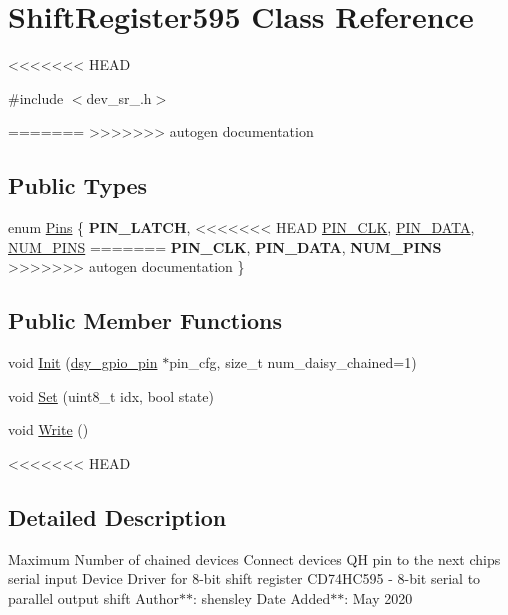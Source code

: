 \hypertarget{class_shift_register595}{}\section{Shift\+Register595 Class Reference}
\label{class_shift_register595}
<<<<<<< HEAD


{\ttfamily \#include $<$dev\+\_\+sr\+\_.\+h$>$}

=======
>>>>>>> autogen documentation
\subsection*{Public Types}
\begin{DoxyCompactItemize}
\item 
enum \hyperlink{class_shift_register595_a2e0140c5d6cac8821d558b2683f7a134}{Pins} \{ {\bfseries P\+I\+N\+\_\+\+L\+A\+T\+CH}, 
<<<<<<< HEAD
\hyperlink{class_shift_register595_a2e0140c5d6cac8821d558b2683f7a134a4e50d83a47cc620a8427d2879aca30ec}{P\+I\+N\+\_\+\+C\+LK}, 
\hyperlink{class_shift_register595_a2e0140c5d6cac8821d558b2683f7a134ae9ea4e9926a41b050735081ea122036b}{P\+I\+N\+\_\+\+D\+A\+TA}, 
\hyperlink{class_shift_register595_a2e0140c5d6cac8821d558b2683f7a134a831131c4aff6b1c4ab21fa12d9c47a38}{N\+U\+M\+\_\+\+P\+I\+NS}
=======
{\bfseries P\+I\+N\+\_\+\+C\+LK}, 
{\bfseries P\+I\+N\+\_\+\+D\+A\+TA}, 
{\bfseries N\+U\+M\+\_\+\+P\+I\+NS}
>>>>>>> autogen documentation
 \}
\end{DoxyCompactItemize}
\subsection*{Public Member Functions}
\begin{DoxyCompactItemize}
\item 
void \hyperlink{class_shift_register595_acc9e7d74069edd4b2711a9de01e9617c}{Init} (\hyperlink{structdsy__gpio__pin}{dsy\+\_\+gpio\+\_\+pin} $\ast$pin\+\_\+cfg, size\+\_\+t num\+\_\+daisy\+\_\+chained=1)
\item 
void \hyperlink{class_shift_register595_a01d31561cd07890ea52d1f39e55a8385}{Set} (uint8\+\_\+t idx, bool state)
\item 
void \hyperlink{class_shift_register595_a9946a50af186043d5532a9ec10b404b7}{Write} ()
\end{DoxyCompactItemize}


<<<<<<< HEAD
\subsection{Detailed Description}
Maximum Number of chained devices Connect device\textquotesingle{}s QH\textquotesingle{} pin to the next chips serial input Device Driver for 8-\/bit shift register C\+D74\+H\+C595 -\/ 8-\/bit serial to parallel output shift Author$\ast$$\ast$\+: shensley Date Added$\ast$$\ast$\+: May 2020 

